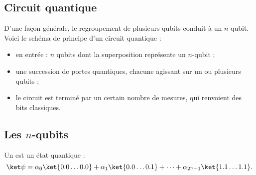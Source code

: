 \documentclass[11pt,class=report,crop=false]{standalone}
\begin{document}
\subsection{Circuit quantique}

D'une façon générale, le regroupement de plusieurs qubits conduit à un \og{}$n$-qubit\fg{}.
Voici le schéma de principe d'un circuit quantique :
\begin{itemize}
  \item en entrée : $n$ qubits dont la superposition représente un $n$-qubit ;
  \item une succession de portes quantiques, chacune agissant sur un ou plusieurs qubits ;
  \item le circuit est terminé par un certain nombre de mesures, qui renvoient des bits classiques.
\end{itemize}




\subsection{Les $n$-qubits}

Un  est un état quantique :
$$\ket\psi = \alpha_0 \ket{0.0\ldots0.0} + \alpha_1\ket{0.0\ldots0.1} + \cdots + \alpha_{2^n-1} \ket{1.1\ldots1.1}.$$
\end{document}
